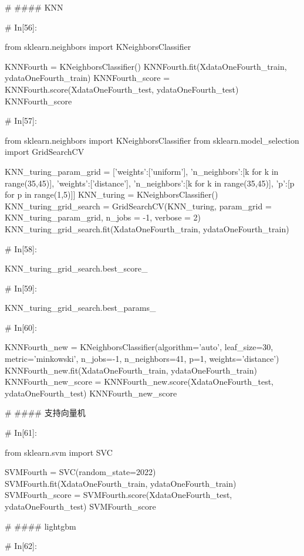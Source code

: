 \documentclass{MathorCupmodeling}
\begin{document}
\begin{python}
# #### KNN

# In[56]:


from sklearn.neighbors import KNeighborsClassifier

KNNFourth = KNeighborsClassifier()
KNNFourth.fit(XdataOneFourth_train, ydataOneFourth_train)
KNNFourth_score = KNNFourth.score(XdataOneFourth_test, ydataOneFourth_test)
KNNFourth_score


# In[57]:


from sklearn.neighbors import KNeighborsClassifier
from sklearn.model_selection import GridSearchCV

KNN_turing_param_grid = [{'weights':['uniform'],
                          'n_neighbors':[k for k in range(35,45)]},
                         {'weights':['distance'],
                          'n_neighbors':[k for k in range(35,45)],
                          'p':[p for p in range(1,5)]}]
KNN_turing = KNeighborsClassifier()
KNN_turing_grid_search = GridSearchCV(KNN_turing,
                                      param_grid = KNN_turing_param_grid,
                                      n_jobs = -1,
                                      verbose = 2)
KNN_turing_grid_search.fit(XdataOneFourth_train, ydataOneFourth_train)


# In[58]:


KNN_turing_grid_search.best_score_


# In[59]:


KNN_turing_grid_search.best_params_


# In[60]:


KNNFourth_new = KNeighborsClassifier(algorithm='auto', leaf_size=30,
                                     metric='minkowski',
                                     n_jobs=-1,
                                     n_neighbors=41, p=1,
                                     weights='distance')
KNNFourth_new.fit(XdataOneFourth_train, ydataOneFourth_train)
KNNFourth_new_score = KNNFourth_new.score(XdataOneFourth_test, ydataOneFourth_test)
KNNFourth_new_score


# #### 支持向量机

# In[61]:


from sklearn.svm import SVC

SVMFourth = SVC(random_state=2022)
SVMFourth.fit(XdataOneFourth_train, ydataOneFourth_train)
SVMFourth_score = SVMFourth.score(XdataOneFourth_test, ydataOneFourth_test)
SVMFourth_score


# #### lightgbm

# In[62]:



\end{python}
\end{document}
